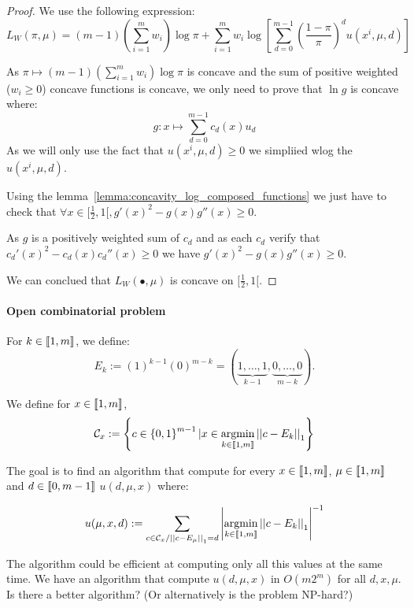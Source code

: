 \begin{proof}
    We use the following expression:
    \[L_W(\pi, \mu) = (m-1)\left(\sum_{i=1}^{m} w_i\right) \log\pi + \sum_{i=1}^{m} w_i \log\left[ \sum_{d = 0}^{m-1} \left(\frac{1 - \pi}{\pi}\right)^d u(x^i, \mu, d) \right] \] 

    As $\pi \mapsto (m-1)\left(\sum_{i=1}^{m} w_i\right) \log\pi$ is concave and the sum of positive weighted ($w_i \geq 0$) concave functions is concave, we only need to prove that $\ln g$ is concave where:
    \[g: x\mapsto \sum_{d=0}^{m-1} c_d(x) u_d \]
    As we will only use the fact that $u(x^i, \mu, d) \geq 0$ we simpliied wlog the $u(x^i, \mu, d)$.

    Using the lemma~\ref{lemma:concavity_log_composed_functions} we just have to check that $\forall x \in [\frac{1}{2}, 1[, g'(x)^2 - g(x) g''(x) \geq 0$.

    As $g$ is a positively weighted sum of $c_d$ and as each $c_d$ verify that $c_d'(x)^2 - c_d(x) c_d''(x) \geq 0$ we have $g'(x)^2 - g(x) g''(x) \geq 0$.
    
    We can conclued that $L_W(\bullet, \mu)$ is concave on $[\frac{1}{2}, 1[$.
\end{proof}

\newpage
\paragraph{Open combinatorial problem}


\begin{definition}
    For $k \in \left\llbracket1, m\right\rrbracket$, we define:
    \[E_k := (1)^{k - 1} (0)^{m - k} = (\underset{k - 1}{\underbrace{1, \dots, 1}}, \underset{m - k}{\underbrace{0, \dots, 0}} ). \]
\end{definition}

We define for $x \in \left\llbracket1, m\right\rrbracket$, 
\[ \mathcal{C}_x := \left\{ c \in \left\{ 0, 1 \right\}^{m - 1} | x \in \operatorname*{argmin}_{k \in \left\llbracket1, m\right\rrbracket} \left|\left|c - E_k\right|\right|_1  \right\} \]

The goal is to find an algorithm that compute for every $x \in \left\llbracket1, m\right\rrbracket$, $\mu \in \left\llbracket1, m\right\rrbracket$ and $d \in \left\llbracket0, m - 1\right\rrbracket$ $u(d, \mu, x)$ where:

\[ u(\mu, x, d) := \sum_{c \in \mathcal{C}_x / \left|\left|c-E_{\mu}\right|\right|_1 = d} \left|\operatorname*{argmin}_{k \in \left\llbracket1, m\right\rrbracket} \left|\left|c - E_k\right|\right|_1\right|^{-1} \]

The algorithm could be efficient at computing only all this values at the same time.
We have an algorithm that compute $u(d, \mu, x)$ in $O(m 2^m)$ for all $d,x,\mu$. Is there a better algorithm? (Or alternatively is the problem NP-hard?)

